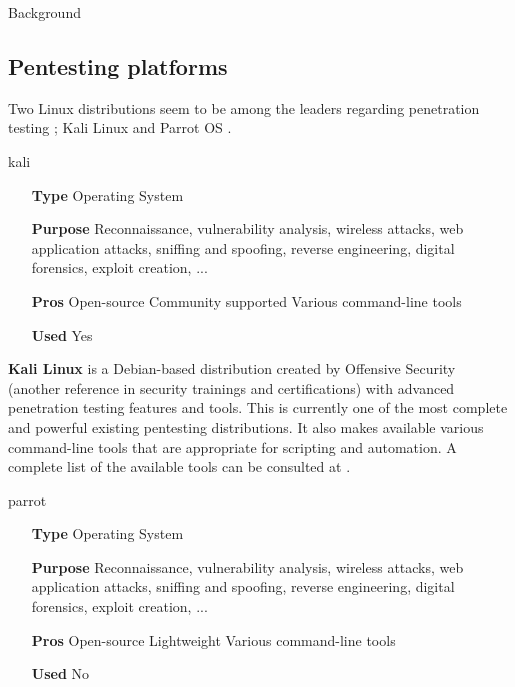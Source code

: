\begin{chaptercover}{Background}
\subsection{Pentesting platforms}

Two Linux distributions seem to be among the leaders regarding penetration testing ; Kali Linux \cite{kali-linux} and Parrot OS \cite{parrot-os}.

\begin{solutiondata}{kali}
\begin{itemize}[labelsep=1cm]
  \item [\textbf{Type}] Operating System
  \item [\textbf{Purpose}] Reconnaissance, vulnerability analysis, wireless attacks, web application attacks, sniffing and spoofing, reverse engineering, digital forensics, exploit creation, ...
  \item [\textbf{Pros}] Open-source \newline Community supported \newline Various command-line tools
  \item [\textbf{Used}] Yes
\end{itemize}
\end{solutiondata}

{
\textbf{Kali Linux} \cite{kali-linux} is a Debian-based distribution created by Offensive Security \cite{offensive-security} (another reference in security trainings and certifications) with advanced penetration testing features and tools. This is currently one of the most complete and powerful existing pentesting distributions. It also makes available various command-line tools that are appropriate for scripting and automation. A complete list of the available tools can be consulted at \cite{kali-linux-tools}.}

\begin{solutiondata}{parrot}
\begin{itemize}[labelsep=1cm]
  \item [\textbf{Type}] Operating System
  \item [\textbf{Purpose}] Reconnaissance, vulnerability analysis, wireless attacks, web application attacks, sniffing and spoofing, reverse engineering, digital forensics, exploit creation, ...
  \item [\textbf{Pros}] Open-source \newline Lightweight \newline Various command-line tools
  \item [\textbf{Used}] No
\end{itemize}
\end{solutiondata}


\end{chaptercover}
